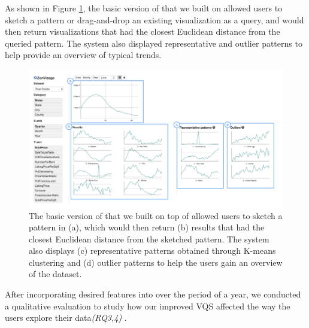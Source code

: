 \par As shown in Figure \ref{oldZV}, the basic version of \zv that we built on allowed users to sketch a pattern or drag-and-drop an existing visualization as a query, and \zv would then return visualizations that had the closest Euclidean distance from the queried pattern. The system also displayed representative and outlier patterns to help provide  an overview of typical trends.
	\begin{figure}[ht!]
	\centering
	\includegraphics[width=\linewidth]{figures/oldZV_nozql.png}
	\caption{The basic version of \zv that we built on top of allowed users to sketch a pattern in (a), which would then return (b) results that had the closest Euclidean distance from the sketched pattern. The system also displays (c) representative patterns obtained through K-means clustering and (d) outlier patterns to help the users gain an overview of the dataset. }
	\label{oldZV}
	\end{figure}
\par After incorporating desired features into \ourVQS over the period of a year, we conducted a qualitative evaluation to study how our improved VQS affected the way the users explore their data{\em (RQ3,4)} . 